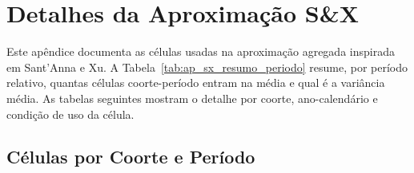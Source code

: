 \chapter{Detalhes da Aproximação S\&X} \label{ap:sx}

Este apêndice documenta as células usadas na aproximação agregada inspirada em Sant'Anna e Xu. A Tabela~\ref{tab:ap_sx_resumo_periodo} resume, por período relativo, quantas células coorte-período entram na média e qual é a variância média. As tabelas seguintes mostram o detalhe por coorte, ano-calendário e condição de uso da célula.



\section{Células por Coorte e Período}





